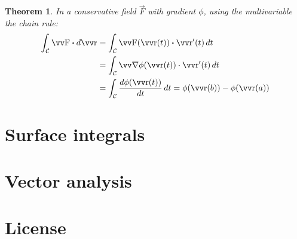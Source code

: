 \documentclass[twocolumn, margin=normal]{tex/hsrzf}
\theoremstyle{fuvarzf}
\newtheorem{theorem}{Theorem}
\begin{document}
\begin{theorem}
  In a conservative field \(\vec{F}\) with gradient \(\phi\), using the
  multivariable the chain rule:
  \begin{align*}
    \int_\mathcal{C} \vec{F} \dotp d\vec{r} 
    &= \int_\mathcal{C} \vec{F}(\vec{r}(t)) \dotp \vec{r}'(t) \,dt \\
    &= \int_\mathcal{C} \grad \phi(\vec{r}(t)) \cdot \vec{r}'(t) \,dt \\
    &= \int_\mathcal{C} \frac{d\phi(\vec{r}(t))}{dt}\,dt
    = \phi(\vec{r}(b)) - \phi(\vec{r}(a))
  \end{align*}
\end{theorem}

\section{Surface integrals}

\section{Vector analysis}

\section*{License}
\doclicenseText

\begin{center}
  \doclicenseImage
\end{center}
\end{document}
